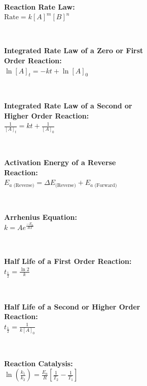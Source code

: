 \\ \begin{minipage}{\textwidth}
    \textbf{Reaction Rate Law:}
    \\ \( \text{Rate} = k [ A ]^m [ B ]^n \)
\end{minipage}
\\ \begin{minipage}{\textwidth}
    \textbf{Integrated Rate Law of a Zero or First \\Order Reaction:}
    \\ \( \ln[ A ]_t = -kt + \ln[ A ]_0 \)
\end{minipage}
\\ \begin{minipage}{\textwidth}
    \textbf{Integrated Rate Law of a Second or \\Higher Order Reaction:}
    \\ \( \displaystyle\frac{ 1 }{ [ A ]_t } = kt + \displaystyle\frac{ 1 }{ [ A ]_0 } \)
\end{minipage}
\\ \begin{minipage}{\textwidth}
    \textbf{Activation Energy of a Reverse \\Reaction:}
    \\ \( E_{a \text{ (Reverse)}} = \Delta E_{\text{(Reverse)}} + E_{a \text{ (Forward)}} \)
\end{minipage}
\\ \begin{minipage}{\textwidth}
    \textbf{Arrhenius Equation:}
    \\ \( k = A e^{\frac{ -E_a }{ RT }} \)
\end{minipage}
\\ \begin{minipage}{\textwidth}
    \textbf{Half Life of a First Order Reaction:}
    \\ \( t_{\frac{ 1 }{ 2 }} = \displaystyle\frac{ \ln 2 }{ k } \)
\end{minipage}
\\ \begin{minipage}{\textwidth}
    \textbf{Half Life of a Second or Higher Order \\Reaction:}
    \\ \( t_{\frac{ 1 }{ 2 }} = \displaystyle\frac{ 1 }{ k [ A ]_0 } \)
\end{minipage}
\\ \begin{minipage}{\textwidth}
    \textbf{Reaction Catalysis:}
    \\ \( \ln \left( \displaystyle\frac{ k_1 }{ k_2 } \right) = \displaystyle\frac{ E_a }{ R } \left[ \displaystyle\frac{ 1 }{ T_2 } - \displaystyle\frac{ 1 }{ T_1 } \right] \)
\end{minipage}
